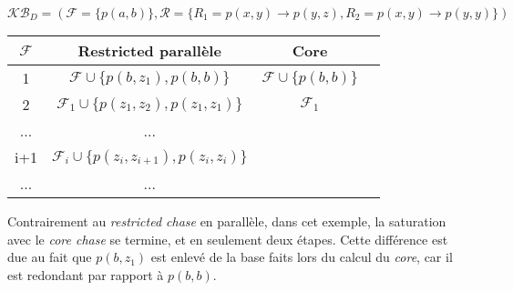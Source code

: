 \begin{example}
$\mathcal{KB}_D = (\mathcal{F} = \{p(a,b)\}, \mathcal{R} = \{R_1 = p(x,y) \rightarrow p(y,z) , R_2 = p(x,y) \rightarrow p(y,y) \})$

\begin{center}
\begin{tabular}{|c|c|c|c|}
    \hline
    $\mathcal{F}$ & Restricted parallèle & Core \\ 
    \hline
    1 &  $\mathcal{F} \cup \{p(b, z_1), p(b,b)\} $ & $\mathcal{F} \cup \{ p(b,b)\}$\\ 
    \hline
    2 &$\mathcal{F}_1 \cup \{p(z_1, z_2), p(z_1, z_1)\}$ & $\mathcal{F}_1$ \\
    \hline
    ... & ... & \\
    \hline
    i+1 &  $\mathcal{F}_i \cup \{p(z_{i}, z_{i+1}), p(z_{i}, z_{i})\} $  & \\
     \hline
     ... &  ...  & \\
     \hline
\end{tabular}
\end{center}
\end{example}

Contrairement au \textit{restricted chase} en parallèle, dans cet exemple, la saturation avec le \textit{core chase} se termine, et en seulement deux étapes. Cette différence est due au fait que $p(b, z_1)$ est enlevé de la base faits lors du calcul du \textit{core}, car il est redondant par rapport à $p(b, b)$.

